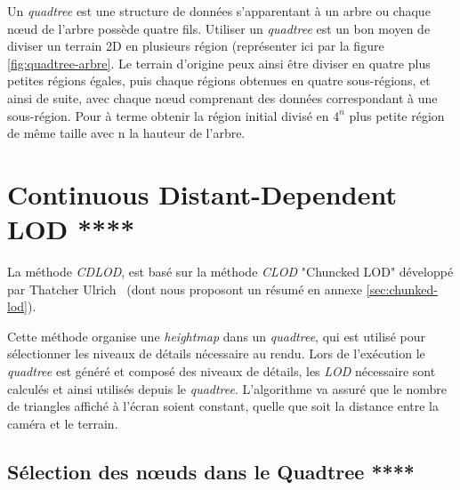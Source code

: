  Un \emph{quadtree} est une structure de données s'apparentant à un arbre ou chaque n\oe{}ud de l'arbre possède quatre fils. Utiliser un \emph{quadtree} est un bon moyen de diviser un terrain 2D en plusieurs région (représenter ici par la figure \ref{fig:quadtree-arbre}. Le terrain d'origine peux ainsi être diviser en quatre plus petites régions égales, puis chaque régions obtenues en quatre sous-régions, et ainsi de suite, avec chaque n\oe{}ud comprenant des données correspondant à une sous-région. Pour à terme obtenir la région initial divisé en $4^n$ plus petite région de même taille avec n la hauteur de l'arbre.

  
\vspace{1.5cm}

\section{Continuous Distant-Dependent LOD ****}


  La méthode \textit{CDLOD}, est basé sur la méthode \textit{CLOD} "Chuncked LOD" développé par Thatcher Ulrich~\cite{CLOD} (dont nous proposont un résumé en annexe \ref{sec:chunked-lod}).
  

  Cette méthode organise une \emph{heightmap} dans un \emph{quadtree}, qui est utilisé pour sélectionner les niveaux de détails nécessaire au rendu. Lors de l'exécution le \emph{quadtree} est généré et composé des niveaux de détails, les \emph{LOD} nécessaire sont calculés et ainsi utilisés depuis le \emph{quadtree}. L'algorithme va assuré que le nombre de triangles affiché à l'écran soient constant, quelle que soit la distance entre la caméra et le terrain.
  
 \subsection{Sélection des n\oe{}uds dans le Quadtree ****}
 
